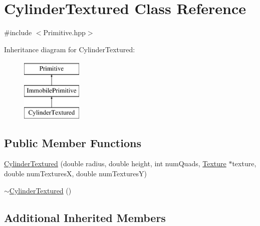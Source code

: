 \hypertarget{class_cylinder_textured}{\section{Cylinder\-Textured Class Reference}
\label{class_cylinder_textured}
}


{\ttfamily \#include $<$Primitive.\-hpp$>$}

Inheritance diagram for Cylinder\-Textured\-:\begin{figure}[H]
\begin{center}
\leavevmode
\includegraphics[height=3.000000cm]{class_cylinder_textured}
\end{center}
\end{figure}
\subsection*{Public Member Functions}
\begin{DoxyCompactItemize}
\item 
\hyperlink{class_cylinder_textured_a548d9c6be25c9fe1bcef06fdf69bfe5e}{Cylinder\-Textured} (double radius, double height, int num\-Quads, \hyperlink{class_texture}{Texture} $\ast$texture, double num\-Textures\-X, double num\-Textures\-Y)
\item 
\hyperlink{class_cylinder_textured_afce815dae7fb506d435d93adb35642bd}{$\sim$\-Cylinder\-Textured} ()
\end{DoxyCompactItemize}
\subsection*{Additional Inherited Members}


